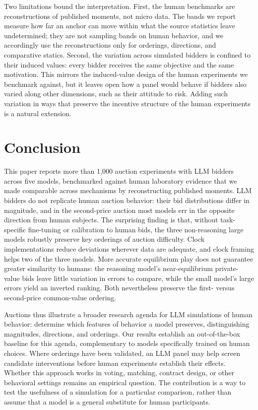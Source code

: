 \documentclass{article} %
\newif\ifmarkrev
\newcommand{\rev}[1]{\ifmarkrev\begingroup\color{red}#1\endgroup\else#1\fi}
\begin{document}
\rev{Two limitations bound the interpretation. First, the human benchmarks are reconstructions of published moments, not micro data. The bands we report measure how far an anchor can move within what the source statistics leave undetermined; they are not sampling bands on human behavior, and we accordingly use the reconstructions only for orderings, directions, and comparative statics. Second, the variation across simulated bidders is confined to their induced values: every bidder receives the same objective and the same motivation. This mirrors the induced-value design of the human experiments we benchmark against, but it leaves open how a panel would behave if bidders also varied along other dimensions, such as their attitude to risk. Adding such variation in ways that preserve the incentive structure of the human experiments is a natural extension.}


\section{Conclusion}\label{sec:conclusion}

\rev{This paper reports more than 1,000 auction experiments with LLM bidders across five models, benchmarked against human laboratory evidence that we made comparable across mechanisms by reconstructing published moments. LLM bidders do not replicate human auction behavior: their bid distributions differ in magnitude, and in the second-price auction most models err in the opposite direction from human subjects. The surprising finding is that, without task-specific fine-tuning or calibration to human bids, the three non-reasoning large models robustly preserve key orderings of auction difficulty. Clock implementations reduce deviations wherever data are adequate, and clock framing helps two of the three models. More accurate equilibrium play does not guarantee greater similarity to humans: the reasoning model's near-equilibrium private-value bids leave little variation in errors to compare, while the small model's large errors yield an inverted ranking. Both nevertheless preserve the first- versus second-price common-value ordering.}

\rev{Auctions thus illustrate a broader research agenda for LLM simulations of human behavior: determine which features of behavior a model preserves, distinguishing magnitudes, directions, and orderings. Our results establish an out-of-the-box baseline for this agenda, complementary to models specifically trained on human choices. Where orderings have been validated, an LLM panel may help screen candidate interventions before human experiments establish their effects. Whether this approach works in voting, matching, contract design, or other behavioral settings remains an empirical question. The contribution is a way to test the usefulness of a simulation for a particular comparison, rather than assume that a model is a general substitute for human participants.}
\end{document}
